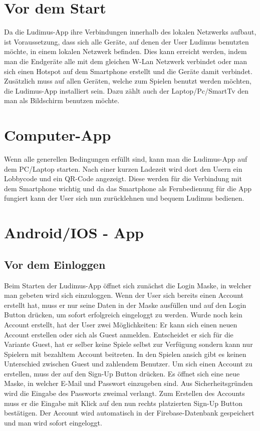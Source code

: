 \section{Vor dem Start}
Da die Ludimus-App ihre Verbindungen innerhalb des lokalen Netzwerks aufbaut, ist Voraussetzung, dass sich alle Geräte, auf denen der User Ludimus benutzten möchte, in einem lokalen Netzwerk befinden. Dies kann erreicht werden, indem man die Endgeräte alle mit dem gleichen W-Lan Netzwerk verbindet oder man sich einen Hotspot auf dem Smartphone erstellt und die Geräte damit verbindet. Zusätzlich muss auf allen Geräten, welche zum Spielen benutzt werden möchten, die Ludimus-App installiert sein. Dazu zählt auch der Laptop/Pc/SmartTv den man als Bildschirm benutzen möchte.
\section{Computer-App}
Wenn alle generellen Bedingungen erfüllt sind, kann man die Ludimus-App auf dem PC/Laptop starten. Nach einer kurzen Ladezeit wird dort den Usern ein Lobbycode und ein QR-Code angezeigt. Diese werden für die Verbindung mit dem Smartphone wichtig und da das Smartphone als Fernbedienung für die App fungiert kann der User sich nun zurücklehnen und bequem Ludimus bedienen.
\section{Android/IOS - App}
\subsection{Vor dem Einloggen}
Beim Starten der Ludimus-App öffnet sich zunächst die Login Maske, in welcher man gebeten wird sich einzuloggen. Wenn der User sich bereits einen Account erstellt hat, muss er nur seine Daten in der Maske ausfüllen und auf den Login Button drücken, um sofort erfolgreich eingeloggt zu werden. Wurde noch kein Account erstellt, hat der User zwei Möglichkeiten: Er kann sich einen neuen Account erstellen oder sich als Guest anmelden. Entscheidet er sich für die Variante Guest, hat er selber keine Spiele selbst zur Verfügung sondern kann nur Spielern mit bezahltem Account beitreten. In den Spielen ansich gibt es keinen Unterschied zwischen Guest und zahlendem Benutzer. Um sich einen Account zu erstellen, muss der auf den Sign-Up Button drücken. Es öffnet sich eine neue Maske, in welcher E-Mail und Passwort einzugeben sind. Aus Sicherheitsgründen wird die Eingabe des Passworts zweimal verlangt. Zum Erstellen des Accounts muss er die Eingabe mit Klick auf den nun rechts platzierten Sign-Up Button bestätigen. Der Account wird automatisch in der Firebase-Datenbank gespeichert und man wird sofort eingeloggt.
